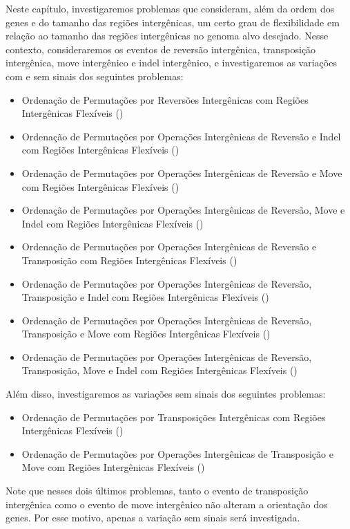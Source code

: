 
Neste capítulo, investigaremos problemas que consideram, além da ordem dos genes e do tamanho das regiões intergênicas, um certo grau de flexibilidade em relação ao tamanho das regiões intergênicas no genoma alvo desejado. Nesse contexto, consideraremos os eventos de reversão intergênica, transposição intergênica, move intergênico e indel intergênico, e investigaremos as variações com e sem sinais dos seguintes problemas:

\begin{itemize}
  \item Ordenação de Permutações por Reversões Intergênicas com Regiões Intergênicas Flexíveis (\SbFIR)
  \item Ordenação de Permutações por Operações Intergênicas de Reversão e Indel com Regiões Intergênicas Flexíveis (\SbFIRI)
  \item Ordenação de Permutações por Operações Intergênicas de Reversão e Move com Regiões Intergênicas Flexíveis (\SbFIRM)
  \item Ordenação de Permutações por Operações Intergênicas de Reversão, Move e Indel com Regiões Intergênicas Flexíveis (\SbFIRMI)
  \item Ordenação de Permutações por Operações Intergênicas de Reversão e Transposição com Regiões Intergênicas Flexíveis (\SbFIRT)
  \item Ordenação de Permutações por Operações Intergênicas de Reversão, Transposição e Indel com Regiões Intergênicas Flexíveis (\SbFIRTI)
  \item Ordenação de Permutações por Operações Intergênicas de Reversão, Transposição e Move com Regiões Intergênicas Flexíveis (\SbFIRTM)
  \item Ordenação de Permutações por Operações Intergênicas de Reversão, Transposição, Move e Indel com Regiões Intergênicas Flexíveis (\SbFIRTMI)
\end{itemize}

Além disso, investigaremos as variações sem sinais dos seguintes problemas:

\begin{itemize}
  \item Ordenação de Permutações por Transposições Intergênicas com Regiões Intergênicas Flexíveis (\SbFIT)
  \item Ordenação de Permutações por Operações Intergênicas de Transposição e Move com Regiões Intergênicas Flexíveis (\SbFITM)
\end{itemize}

Note que nesses dois últimos problemas, tanto o evento de transposição intergênica como o evento de move intergênico não alteram a orientação dos genes. Por esse motivo, apenas a variação sem sinais será investigada.

